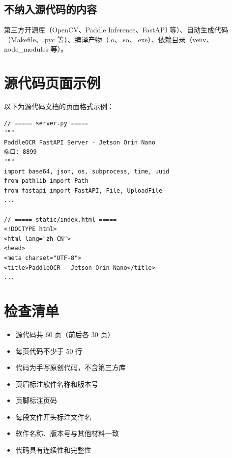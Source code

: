 \documentclass[12pt,a4paper]{ctexart}
\begin{document}
\subsection{不纳入源代码的内容}
第三方开源库（OpenCV、Paddle Inference、FastAPI 等）、自动生成代码（Makefile、.pyc 等）、编译产物（.o、.so、.exe）、依赖目录（venv、node\_modules 等）。

\section{源代码页面示例}

以下为源代码文档的页面格式示例：

\newpage
\setcounter{page}{1}

\begin{lstlisting}[caption={示例：server.py 和 static/index.html}]
// ===== server.py =====
"""
PaddleOCR FastAPI Server - Jetson Orin Nano
端口: 8899
"""
import base64, json, os, subprocess, time, uuid
from pathlib import Path
from fastapi import FastAPI, File, UploadFile
...

// ===== static/index.html =====
<!DOCTYPE html>
<html lang="zh-CN">
<head>
<meta charset="UTF-8">
<title>PaddleOCR - Jetson Orin Nano</title>
...
\end{lstlisting}

\section{检查清单}

\begin{itemize}
    \item[\checkedbox] 源代码共 60 页（前后各 30 页）
    \item[\checkedbox] 每页代码不少于 50 行
    \item[\checkedbox] 代码为手写原创代码，不含第三方库
    \item[\checkedbox] 页眉标注软件名称和版本号
    \item[\checkedbox] 页脚标注页码
    \item[\checkedbox] 每段文件开头标注文件名
    \item[\checkedbox] 软件名称、版本号与其他材料一致
    \item[\checkedbox] 代码具有连续性和完整性
\end{itemize}
\end{document}
